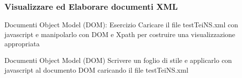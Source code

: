 \begin{frame}
    \frametitle{Visualizzare ed Elaborare documenti XML}
    \addtocounter{nframe}{1}
    

     \begin{block}{Documenti Object Model (DOM): Esercizio}
       Caricare il file testTeiNS.xml con javascript e manipolarlo con DOM e Xpath per costruire una visualizzazione appropriata
     \end{block}

     \begin{block}{Documenti Object Model (DOM)}
        Scrivere un foglio di stile e applicarlo con javascript al documento DOM caricando il file testTeiNS.xml
     \end{block}


\end{frame}